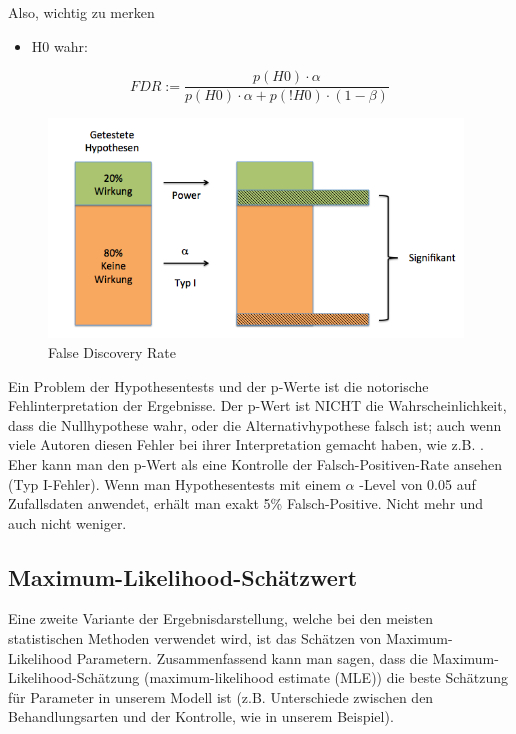 \documentclass[a4paper,twoside]{tufte-book}\usepackage[]{graphicx}\usepackage[]{color}
\begin{document}
Also, wichtig zu merken

\begin{itemize}
  \item H0 wahr: 
\end{itemize}


\begin{equation}
FDR := \frac{p(H0) \cdot \alpha}{ p(H0) \cdot \alpha + p(!H0) \cdot (1-\beta)}
\end{equation}


\begin{figure}[htb]
\begin{center}
\includegraphics[width = 11cm]{FDR}
\caption{False Discovery Rate}
\label{fig: Error Types}
\end{center}
\end{figure}


Ein Problem der Hypothesentests und der p-Werte ist die notorische Fehlinterpretation der Ergebnisse. Der p-Wert ist NICHT die Wahrscheinlichkeit, dass die Nullhypothese wahr, oder die Alternativhypothese falsch ist; auch wenn viele Autoren diesen Fehler bei ihrer Interpretation gemacht haben, wie z.B. \citep[][]{Cohen-earthisround-1994}. Eher kann man den p-Wert als eine Kontrolle der Falsch-Positiven-Rate ansehen (Typ I-Fehler). Wenn man Hypothesentests mit einem $\alpha$ -Level von 0.05 auf Zufallsdaten anwendet, erhält man exakt 5\% Falsch-Positive. Nicht mehr und auch nicht weniger.  

\subsection{Maximum-Likelihood-Schätzwert}

Eine zweite Variante der Ergebnisdarstellung, welche bei den meisten statistischen Methoden verwendet wird, ist das Schätzen von Maximum-Likelihood Parametern. Zusammenfassend kann man sagen, dass die Maximum-Likelihood-Schätzung (maximum-likelihood estimate (MLE)) die beste Schätzung für Parameter in unserem Modell ist (z.B. Unterschiede zwischen den Behandlungsarten und der Kontrolle, wie in unserem Beispiel).
\end{document}
